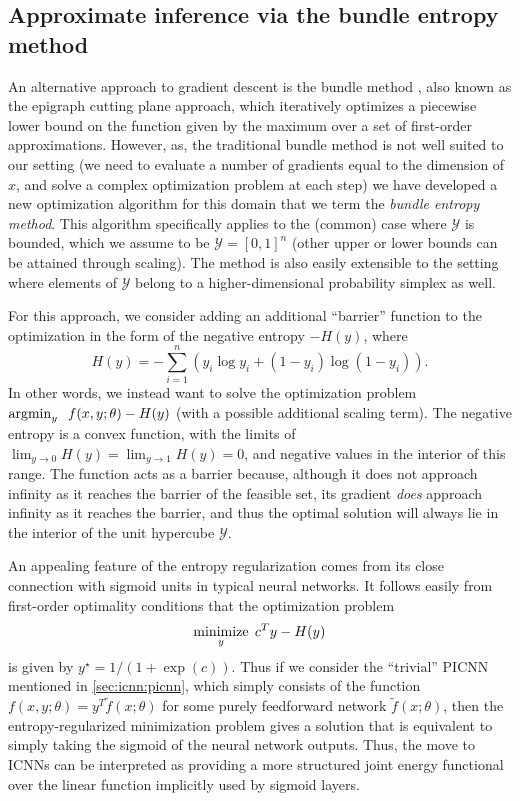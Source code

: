 \subsection{Approximate inference via the bundle entropy method}
\label{sec:icnn:inf:be}
An alternative approach to gradient descent is the bundle method
\citep{smola2007bundle}, also known as the epigraph cutting plane approach,
which iteratively optimizes a piecewise lower bound on the function given by the
maximum over a set of first-order approximations.  However, as, the traditional
bundle method is not well suited to our setting (we need to evaluate a number
of gradients equal to the dimension of $x$, and solve a complex optimization
problem at each step) we have developed a new optimization algorithm for
this domain that we term the \emph{bundle entropy method}.  This algorithm
specifically applies to the (common) case where $\mathcal{Y}$
is bounded, which we assume to be $\mathcal{Y} = [0,1]^n$
(other upper or lower bounds can be attained through scaling).
The method is also easily extensible to the setting where elements
of $\mathcal{Y}$ belong to a higher-dimensional probability simplex as well.

For this approach, we consider adding an additional ``barrier'' function to the
optimization in the form of the negative entropy $-H(y)$, where
\begin{equation}
H(y) = -\sum_{i=1}^n(y_i\log y_i + (1-y_i)\log(1-y_i)).
\end{equation}
In other words, we instead want to solve the optimization problem $\operatorname*{argmin}_y
\;\; f(x,y;\theta) - H(y)$ (with a possible additional scaling term).
The negative entropy is a convex function, with the limits
of $\lim_{y\rightarrow 0} H (y)=\lim_{y\rightarrow1} H(y) = 0$, and negative
values in the interior of this range.  The function acts as a barrier because,
although it does not approach infinity as it reaches the barrier of the feasible
set, its gradient \emph{does} approach infinity as it reaches the barrier, and
thus the optimal solution will always lie in the interior of the unit hypercube
$\mathcal{Y}$.

An appealing feature of the entropy regularization comes from its close
connection with sigmoid units in typical neural networks.  It follows easily
from first-order optimality conditions that the optimization problem
\begin{equation}
\operatorname*{minimize}_y \; c^T y - H(y)
\end{equation}
is given by $y^\star = 1/(1+\exp(c))$.  Thus if we consider the ``trivial''
PICNN mentioned in \cref{sec:icnn:picnn}, which simply consists of the
function $f(x,y;\theta) = y^T \tilde{f}(x;\theta)$ for some purely feedforward
network $\tilde{f}(x;\theta)$, then the entropy-regularized minimization problem
gives a solution that is equivalent to simply taking the sigmoid of the neural
network outputs.  Thus, the move to ICNNs can be interpreted as providing a
more structured joint energy functional over the linear function implicitly used
by sigmoid layers.

